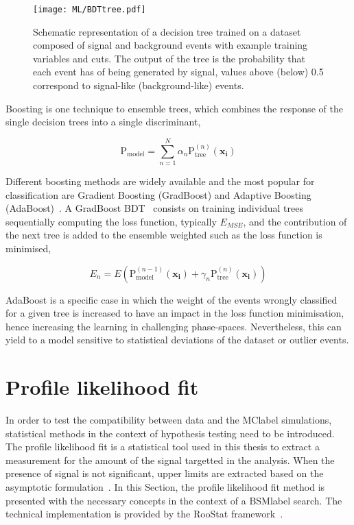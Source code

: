 \begin{figure}[htbp]
    \RawFloats
    \begin{center}
    \texttt{[image: ML/BDTtree.pdf]}
    \caption{
        Schematic representation of a decision tree trained on a dataset composed of signal and background events with example training variables and cuts. The output of the tree is the probability that each event has of being generated by signal, values above (below) 0.5 correspond to signal-like (background-like) events.
    }
    \label{ML:BDT}
    \end{center}
\end{figure}

Boosting is one technique to ensemble trees, which combines the response of the single decision trees into a single discriminant,

\begin{equation}
    \text{P}_{\text{model}} = \sum_{n=1}^N \alpha_n \text{P}_{\text{tree}}^{(n)}(\mathbf{x_i})
\end{equation}

Different boosting methods are widely available and the most popular for classification are Gradient Boosting (GradBoost) and Adaptive Boosting (AdaBoost)~\cite{FREUND1997119}. A GradBoost BDT~\cite{Chen_2016} consists on training individual trees sequentially computing the loss function, typically $E_{MSE}$, and the contribution of the next tree is added to the ensemble weighted such as the loss function is minimised,

\begin{equation}
    E_n = E\left(\text{P}_{\text{model}}^(n-1)(\mathbf{x_i})+\gamma_n \text{P}_{\text{tree}}^{(n)}(\mathbf{x_i})\right)
\end{equation}

AdaBoost is a specific case in which the weight of the events wrongly classified for a given tree is increased to have an impact in the loss function minimisation, hence increasing the learning in challenging phase-spaces. Nevertheless, this can yield to a model sensitive to statistical deviations of the dataset or outlier events.


\section{Profile likelihood fit}
\label{sec:profilelikelihoodfit}
In order to test the compatibility between data and the \acrshort{MClabel} simulations, statistical methods in the context of hypothesis testing need to be introduced. The profile likelihood fit is a statistical tool used in this thesis to extract a measurement for the amount of the signal targetted in the analysis. When the presence of signal is not significant, upper limits are extracted based on the asymptotic formulation~\cite{Cowan_2011}. In this Section, the profile likelihood fit method is presented with the necessary concepts in the context of a \acrshort{BSMlabel} search.
The technical implementation is provided by the RooStat framework~\cite{10.48550/arxiv.1009.1003}.

